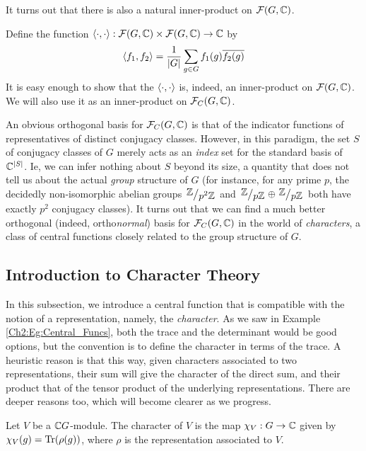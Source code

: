 It turns out that there is also a natural inner-product on $\mathcal{F}\!\left( G, \mathbb{C} \right)$.

\begin{boxdefinition}
    Define the function $\left\langle \cdot, \cdot \right\rangle : \mathcal{F}\!\left( G, \mathbb{C} \right) \times \mathcal{F}\!\left( G, \mathbb{C} \right) \to \mathbb{C}$ by
    \begin{align}
        \left\langle f_1, f_2 \right\rangle = \frac{1}{\left\lvert G \right\rvert} \sum_{g \in G} f_1(g) \overline{f_2(g)}
        \label{SP:eq:Char_Inner_Product}
    \end{align}
    It is easy enough to show that the $\left\langle \cdot, \cdot \right\rangle$ is, indeed, an inner-product on $\mathcal{F}\!\left( G, \mathbb{C} \right)$. We will also use it as an inner-product on $\mathcal{F}_C\!\left( G, \mathbb{C} \right)$.
\end{boxdefinition}

An obvious orthogonal basis for $\mathcal{F}_C\!\left( G, \mathbb{C} \right)$ is that of the indicator functions of representatives of distinct conjugacy classes. However, in this paradigm, the set $S$ of conjugacy classes of $G$ merely acts as an \textit{index} set for the standard basis of $\mathbb{C}^{\left\lvert S \right\rvert}$. Ie, we can infer nothing about $S$ beyond its size, a quantity that does not tell us about the actual \textit{group} structure of $G$ (for instance, for any prime $p$, the decidedly non-isomorphic abelian groups $\quotient{\Z}{p^2\Z}$ and $\quotient{\Z}{p\Z} \+ \quotient{\Z}{p\Z}$ both have exactly $p^2$ conjugacy classes). It turns out that we can find a much better orthogonal (indeed, ortho\textit{normal}) basis for $\mathcal{F}_C\!\left( G, \mathbb{C} \right)$ in the world of \textit{characters}, a class of central functions closely related to the group structure of $G$.

\subsection{Introduction to Character Theory}

In this subsection, we introduce a central function that is compatible with the notion of a representation, namely, the \textit{character}. As we saw in Example \ref{Ch2:Eg:Central_Funcs}, both the trace and the determinant would be good options, but the convention is to define the character in terms of the trace. A heuristic reason is that this way, given characters associated to two representations, their sum will give the character of the direct sum, and their product that of the tensor product of the underlying representations. There are deeper reasons too, which will become clearer as we progress.

\begin{boxdefinition}[Character]
    Let $V$ be a $\mathbb{C} G$-module. The character of $V$ is the map $\chi_V : G \to \mathbb{C}$ given by $\chi_V(g) = \operatorname{Tr}\!\left( \rho(g) \right)$, where $\rho$ is the representation associated to $V$.
\end{boxdefinition}


